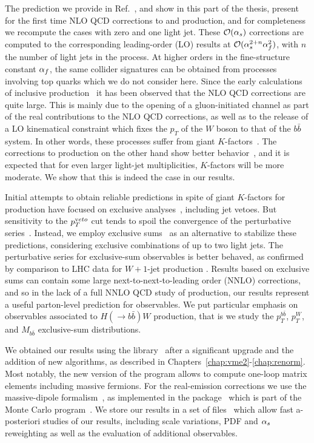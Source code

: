 The prediction we provide in Ref.~\cite{wbbpaper}, and show in this
part of the thesis, present for the first time NLO QCD corrections to \Wbbnj[2]{} and
\Wbbnj[3]{} production, and for completeness we recompute the cases with zero
and one light jet. 
%
These ${\cal O}(\alpha_s)$ corrections are computed to the corresponding
leading-order (LO) results at ${\cal O}(\alpha_s^{2+n}\alpha_f^2)$, with $n$ the number of light jets in the process.
%
At higher orders in the fine-structure constant $\alpha_f$, the same
collider signatures can be obtained from processes involving top quarks which we do not consider here.
%
Since the early calculations of inclusive \Wbb{}
production~\cite{Ellis:1998fv,FebresCordero:2006sj,Cordero:2009kv} it has been
observed that the NLO QCD corrections are quite large. This is mainly due to
the opening of a gluon-initiated channel as part of the real contributions to
the NLO QCD corrections, as well as to the release of a LO
kinematical constraint which fixes the $p_T$ of the $W$ boson to that of the
$b\bar b$ system. In other words, these processes suffer from giant
$K$-factors~\cite{Rubin:2010xp}. The corrections to \Wbbnj[1]{} production on the
other hand show better behavior~\cite{Luisoni:2015mpa}, and it is expected that
for even larger light-jet multiplicities, $K$-factors will be more moderate. We show that this is indeed the case in our
results.

Initial attempts to obtain reliable predictions in spite of giant $K$-factors for \Wbb{} production have focused on
exclusive analyses~\cite{FebresCordero:2006sj}, including jet vetoes. But sensitivity to the
$p_T^{\textrm veto}$ cut tends to spoil the convergence of the
perturbative series~\cite{Tackmann:2012bt}. Instead, we employ exclusive sums~\cite{ESums} as an alternative to
stabilize these predictions, considering exclusive combinations of up to two
light jets. The perturbative series for exclusive-sum observables is
better behaved, as confirmed by comparison to LHC
data for $W+1$-jet
production \cite{Aad:2014qxa,ATLAS:ratio2017}. Results based on exclusive sums can contain some large next-to-next-to-leading order
(NNLO) corrections, and so in the lack of a full NNLO QCD study of \Wbb{} production,
our results represent a useful parton-level prediction for \Wbb{} observables. 
We put particular emphasis on observables associated to $H(\rightarrow b{\bar b})W$ 
production, that is we study the $p_T^{b\bar b}$, $p_T^W$, and
$M_{b\bar b}$ exclusive-sum distributions.

We obtained our results using the \BlackHat{} library~ \cite{Berger:2008sj} after
a significant upgrade and the addition of new algorithms, as described
in Chapters~\ref{chap:vme2}-\ref{chap:renorm}.  Most notably, the new version of the
program allows to compute one-loop matrix elements
including massive fermions. For the real-emission
corrections we use the massive-dipole formalism~\cite{Catani2002}, as
implemented in the \COMIX{} package~\cite{Comix} which is part of
the \SHERPA{} Monte Carlo program~\cite{Sherpa}. We store our results in a set
of \ntuple{} files~\cite{BH:Ntuples} which allow fast a-posteriori studies of
our results, including scale variations, PDF and $\alpha_s$ reweighting as well as the evaluation of additional observables. 

